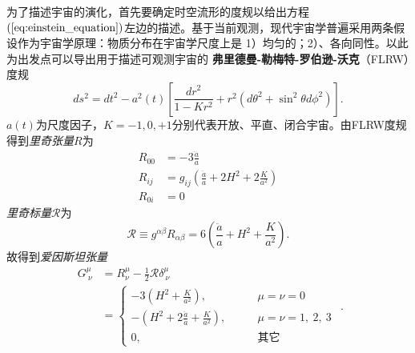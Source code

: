 为了描述宇宙的演化，首先要确定时空流形的度规以给出方程$(\ref{eq:einstein_equation})$左边的描述。基于当前观测，现代宇宙学普遍采用两条假设作为宇宙学原理：物质分布在宇宙学尺度上是
1）均匀的；2）、各向同性。以此为出发点可以导出用于描述可观测宇宙的
\textbf{弗里德曼-勒梅特-罗伯逊-沃克}（FLRW）度规
\begin{equation}\label{eq:frw_metric}
    ds^2=dt^2-a^2(t)\left[\frac{dr^2}{1-Kr^2}+r^2\left(d\theta^2+\sin^2\theta
    d\phi^2\right)\right].
\end{equation}
$a(t)$为尺度因子，$K=-1, 0,
+1$分别代表开放、平直、闭合宇宙。由FLRW度规得到\textit{里奇张量}$R$为
\begin{equation}
    \begin{split}
        R_{00} &= -3\frac{\ddot{a}}{a} \\
        R_{ij} &= g_{ij}\left(\frac{\ddot{a}}{a}+2H^2+2\frac{K}{a^2}\right) \\
        R_{0i} &= 0
    \end{split}
\end{equation}
\textit{里奇标量}$\mathcal{R}$为
\begin{equation}
    \label{eq:ricci_scalar}
    \mathcal{R} \equiv g^{\alpha\beta}R_{\alpha\beta} =
    6\left(\frac{\ddot{a}}{a}+H^2+\frac{K}{a^2}\right).
\end{equation}
故得到\textit{爱因斯坦张量}
\begin{equation}
    \label{eq:einstein_tensor}
    \begin{split}
        G^{\mu}_{\ \nu} &= R^{\mu}_{\nu} -
        \frac{1}{2}\mathcal{R}\delta^{\mu}_{\ \nu}\\
        &=
        \begin{cases}
            -3(H^2 + \frac{K}{a^2}),\qquad &\mu=\nu=0 \\
            -(H^2+2\frac{\ddot{a}}{a}+\frac{K}{a^2}),\qquad
            &\mu=\nu=1,\ 2,\ 3 \\
            0,\qquad &\text{其它}
        \end{cases}
    \end{split}.
\end{equation}

